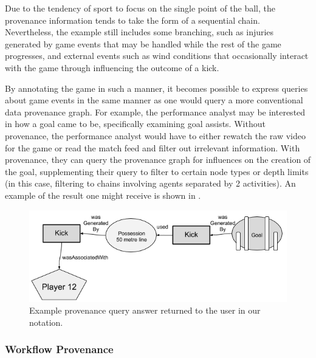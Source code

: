 {Due to the tendency of sport to focus on the single point of the ball,
the provenance information tends to take the form of a
sequential chain. Nevertheless, the example still includes some branching, such as
injuries generated by game events that may be handled while the rest of
the game progresses, and external events such as wind conditions that
occasionally interact with the game through influencing the outcome of a
kick.}

{By annotating the game in such a manner, it becomes possible to express
queries about game events in the same manner as one would query a more
conventional data provenance graph. For example, the performance analyst
may be interested in how a goal came to be, specifically examining goal
assists. Without provenance, the performance analyst would have to
either rewatch the raw video for the game or read the match feed and
filter out irrelevant information. With provenance, they can query the
provenance graph for influences on the creation of the goal,
supplementing their query to filter to certain node types or depth
limits (in this case, filtering to chains involving agents separated by
2 activities). An example of the result one might receive is shown in
.}

{}

\begin{figure}[htbp]
\includegraphics[width=\linewidth]{figs/paper/image3.png}
\caption{Example provenance query answer returned to the user in our notation.}
\label{PhysQueryExample}
\end{figure}

\subsubsection{Workflow Provenance}


